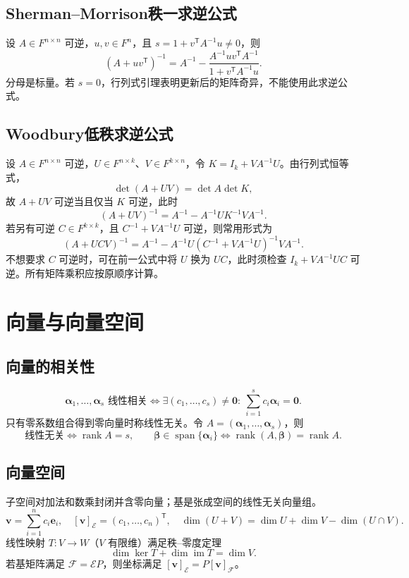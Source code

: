 \documentclass[../main.tex]{subfiles}
\begin{document}
\subsection{Sherman--Morrison秩一求逆公式}
设 $A\in F^{n\times n}$ 可逆，$u,v\in F^n$，且 $s=1+v^{\mathsf T}A^{-1}u\ne0$，则
\[
(A+uv^{\mathsf T})^{-1}
=A^{-1}-\frac{A^{-1}uv^{\mathsf T}A^{-1}}{1+v^{\mathsf T}A^{-1}u}.
\]
分母是标量。若 $s=0$，行列式引理表明更新后的矩阵奇异，不能使用此求逆公式。
\subsection{Woodbury低秩求逆公式}
设 $A\in F^{n\times n}$ 可逆，$U\in F^{n\times k}$、$V\in F^{k\times n}$，令 $K=I_k+VA^{-1}U$。由行列式恒等式，
\[
\det(A+UV)=\det A\det K,
\]
故 $A+UV$ 可逆当且仅当 $K$ 可逆，此时
\[
(A+UV)^{-1}=A^{-1}-A^{-1}UK^{-1}VA^{-1}.
\]
若另有可逆 $C\in F^{k\times k}$，且 $C^{-1}+VA^{-1}U$ 可逆，则常用形式为
\[
(A+UCV)^{-1}
=A^{-1}-A^{-1}U(C^{-1}+VA^{-1}U)^{-1}VA^{-1}.
\]
不想要求 $C$ 可逆时，可在前一公式中将 $U$ 换为 $UC$，此时须检查 $I_k+VA^{-1}UC$ 可逆。所有矩阵乘积应按原顺序计算。
\section{向量与向量空间}
\subsection{向量的相关性}
\[
\bm\alpha_1,\ldots,\bm\alpha_s\text{ 线性相关}\iff
\exists(c_1,\ldots,c_s)\ne\bm0:\ \sum_{i=1}^sc_i\bm\alpha_i=\bm0.
\]
只有零系数组合得到零向量时称线性无关。令 $A=(\bm\alpha_1,\ldots,\bm\alpha_s)$，则
\[
\text{线性无关}\iff\operatorname{rank}A=s,\qquad
\bm\beta\in\operatorname{span}\{\bm\alpha_i\}\iff
\operatorname{rank}(A,\bm\beta)=\operatorname{rank}A.
\]
\subsection{向量空间}
子空间对加法和数乘封闭并含零向量；基是张成空间的线性无关向量组。
\[
\bm v=\sum_{i=1}^nc_i\bm e_i,\quad [\bm v]_{\mathcal E}=(c_1,\ldots,c_n)^{\mathsf T},\quad
\dim(U+V)=\dim U+\dim V-\dim(U\cap V).
\]
线性映射 $T:V\to W$（$V$ 有限维）满足秩--零度定理
\[
\dim\ker T+\dim\operatorname{im}T=\dim V.
\]
若基矩阵满足 $\mathcal F=\mathcal E P$，则坐标满足 $[\bm v]_{\mathcal E}=P[\bm v]_{\mathcal F}$。
\end{document}

